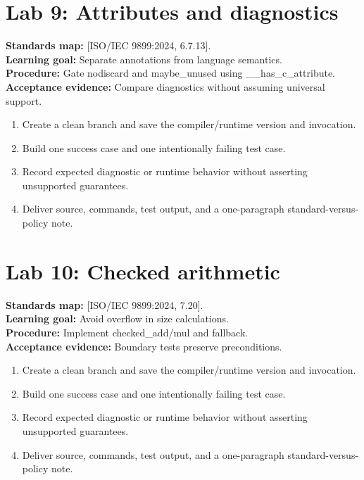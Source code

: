 \documentclass[10pt,letterpaper,oneside]{report}
\newcommand{\refcl}[1]{\textsf{\footnotesize[ISO/IEC 9899:2024, #1]}}
\begin{document}
\section{Lab 9: Attributes and diagnostics}
\textbf{Standards map:} \refcl{6.7.13}.\\
\textbf{Learning goal:} Separate annotations from language semantics.\\
\textbf{Procedure:} Gate nodiscard and maybe\_unused using \_\_has\_c\_attribute.\\
\textbf{Acceptance evidence:} Compare diagnostics without assuming universal support.
\begin{enumerate}
\item Create a clean branch and save the compiler/runtime version and invocation.
\item Build one success case and one intentionally failing test case.
\item Record expected diagnostic or runtime behavior without asserting unsupported guarantees.
\item Deliver source, commands, test output, and a one-paragraph standard-versus-policy note.
\end{enumerate}

\section{Lab 10: Checked arithmetic}
\textbf{Standards map:} \refcl{7.20}.\\
\textbf{Learning goal:} Avoid overflow in size calculations.\\
\textbf{Procedure:} Implement checked\_add/mul and fallback.\\
\textbf{Acceptance evidence:} Boundary tests preserve preconditions.
\begin{enumerate}
\item Create a clean branch and save the compiler/runtime version and invocation.
\item Build one success case and one intentionally failing test case.
\item Record expected diagnostic or runtime behavior without asserting unsupported guarantees.
\item Deliver source, commands, test output, and a one-paragraph standard-versus-policy note.
\end{enumerate}
\end{document}
